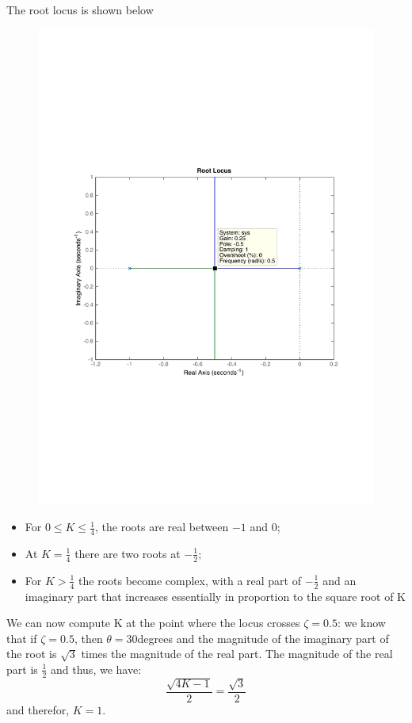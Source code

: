 \begin{frame}
	\begin{exampleblock}{}
		The root locus is shown below
		\begin{figure}
			\centering
			\includegraphics[width=0.7\linewidth]{root_locus_ex1}
		\end{figure}
	\end{exampleblock}
\end{frame}

\begin{frame}
	\begin{exampleblock}{}
		\begin{itemize}
		\item For $0\leq K \leq \frac{1}{4}$, the roots are real between $-1$ and $0$;
		\item At $K = \frac{1}{4}$ there are two roots at $-\frac{1}{2}$;
		\item For $K>\frac{1}{4}$ the roots become complex, with a real part of $-\frac{1}{2}$ and an imaginary part that increases essentially in proportion to the square root of K
		\end{itemize}
		\vspace{1em}
		We can now compute K at the point where the locus crosses $\zeta = 0.5$: we know that if $\zeta = 0.5$, then $\theta = 30$degrees and the magnitude of the imaginary part of the root is $\sqrt{3}$ times the magnitude of the real part. The magnitude of the real part is $\frac{1}{2}$ and thus, we have: \begin{equation}
		\frac{\sqrt{4K - 1}}{2} = \frac{\sqrt{3}}{2}
		\end{equation}
		and therefor, $K = 1$.
		\end{exampleblock}
\end{frame}

